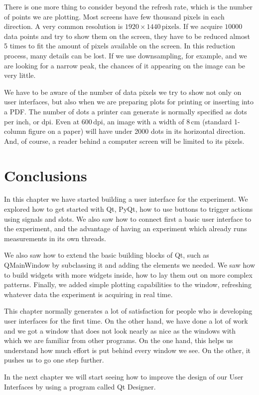 There is one more thing to consider beyond the refresh rate, which is the number of points we are plotting. Most screens have few thousand pixels in each direction. A very common resolution is $1920\times1440\,\textrm{pixels}$. If we acquire $10000$ data points and try to show them on the screen, they have to be reduced almost 5 times to fit the amount of pixels available on the screen. In this reduction process, many details can be lost. If we use downsampling, for example, and we are looking for a narrow peak, the chances of it appearing on the image can be very little.

We have to be aware of the number of data pixels we try to show not only on user interfaces, but also when we are preparing plots for printing or inserting into a PDF. The number of dots a printer can generate is normally specified as dots per inch, or dpi. Even at $600\,\textrm{dpi}$, an image with a width of $8\,\textrm{cm}$ (standard 1-column figure on a paper) will have under 2000 dots in its horizontal direction. And, of course, a reader behind a computer screen will be limited to its pixels. 

\section{Conclusions}\label{sec:basic-gui-conclusions}
In this chapter we have started building a user interface for the experiment. We explored how to get started with Qt, PyQt, how to use buttons to trigger actions using signals and slots. We also saw how to connect first a basic user interface to the experiment, and the advantage of having an experiment which already runs measurements in its own threads.

We also saw how to extend the basic building blocks of Qt, such as QMainWindow by subclassing it and adding the elements we needed. We saw how to build widgets with more widgets inside, how to lay them out on more complex patterns. Finally, we added simple plotting capabilities to the window, refreshing whatever data the experiment is acquiring in real time.

This chapter normally generates a lot of satisfaction for people who is developing user interfaces for the first time. On the other hand, we have done a lot of work and we got a window that does not look nearly as nice as the windows with which we are familiar from other programs. On the one hand, this helps us understand how much effort is put behind every window we see. On the other, it pushes us to go one step further.

In the next chapter we will start seeing how to improve the design of our User Interfaces by using a program called Qt Designer.
